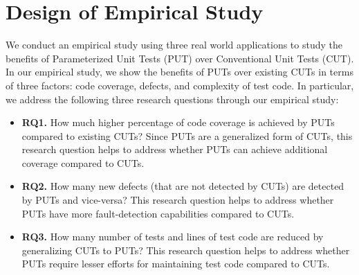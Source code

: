 \section{Design of Empirical Study}

We conduct an empirical study using three real world applications to study the benefits of Parameterized Unit Tests (PUT) over Conventional Unit Tests (CUT). 
In our empirical study, we show the benefits of PUTs over existing CUTs in terms of three factors: code coverage, defects, and complexity of test code. 
In particular, we address the following three research questions through our empirical study:

\begin{itemize}
	\item \textbf{RQ1.} How much higher percentage of code coverage is achieved by PUTs compared to existing CUTs? Since PUTs are a generalized form of CUTs, this research question helps to address whether PUTs can achieve additional coverage compared to CUTs.
	\item \textbf{RQ2.} How many new defects (that are not detected by CUTs) are detected by PUTs and vice-versa? This research question helps to address whether PUTs have more fault-detection capabilities compared to CUTs.
	\item \textbf{RQ3.} How many number of tests and lines of test code are reduced by generalizing CUTs to PUTs? This research question helps to address whether PUTs require lesser efforts for maintaining test code compared to CUTs.
\end{itemize}



